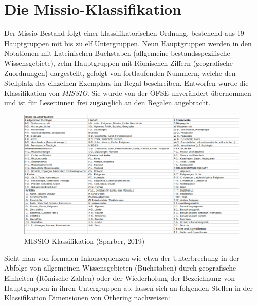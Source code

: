 \documentclass[a4paper,
fontsize=11pt,
oneside,
numbers=noperiodatend,
parskip=half-,
bibliography=totoc,
final
]{scrartcl}
\begin{document}
\hypertarget{die-missio-klassifikation}{%
\section{Die
Missio-Klassifikation}\label{die-missio-klassifikation}}

Der Missio-Bestand folgt einer klassifikatorischen Ordnung, bestehend
aus 19 Hauptgruppen mit bis zu elf Untergruppen. Neun Hauptgruppen
werden in den Notationen mit Lateinischen Buchstaben (allgemeine
bestandsspezifische Wissensgebiete), zehn Hauptgruppen mit Römischen
Ziffern (geografische Zuordnungen) dargestellt, gefolgt von
fortlaufenden Nummern, welche den Stellplatz des einzelnen Exemplars im
Regal beschreiben. Entworfen wurde die Klassifikation von \emph{MISSIO}.
Sie wurde von der ÖFSE unverändert übernommen und ist für Leser:innen
frei zugänglich an den Regalen angebracht.

\begin{figure}
\centering
\includegraphics[width=.99\textwidth]{img/img1.PNG}
\caption{MISSIO-Klassifikation (Sparber, 2019)}
\end{figure}

Sieht man von formalen Inkonsequenzen wie etwa der Unterbrechung in der
Abfolge von allgemeinen Wissensgebieten (Buchstaben) durch geografische
Einheiten (Römische Zahlen) oder der Wiederholung der Bezeichnung von
Hauptgruppen in ihren Untergruppen ab, lassen sich an folgenden Stellen
in der Klassifikation Dimensionen von Othering nachweisen:
\end{document}
